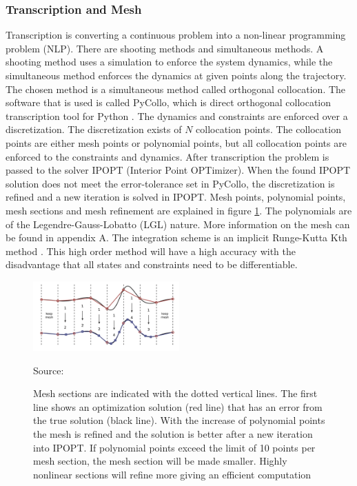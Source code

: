 \subsubsection{Transcription and Mesh}
\noindent Transcription is converting a continuous problem into a non-linear programming problem (NLP). There are shooting methods and simultaneous methods. A shooting method uses a simulation to enforce the system dynamics, while the simultaneous method enforces the dynamics at given points along the trajectory. The chosen method is a simultaneous method called orthogonal collocation. The software that is used is called PyCollo, which is direct orthogonal collocation transcription tool for Python \cite{brockie_predictive_nodate}. The dynamics and constraints are enforced over a discretization. The discretization exists of $N$ collocation points. The collocation points are either mesh points or polynomial points, but all collocation points are enforced to the constraints and dynamics. After transcription the problem is passed to the solver IPOPT (Interior Point OPTimizer). When the found IPOPT solution does not meet the error-tolerance set in PyCollo, the discretization is refined and a new iteration is solved in IPOPT. Mesh points, polynomial points, mesh sections and mesh refinement are explained in figure \ref{f_phmesh}. The polynomials are of the Legendre-Gauss-Lobatto (LGL) nature. More information on the mesh can be found in appendix A. The integration scheme is an implicit Runge-Kutta Kth method \cite{brockie_predictive_nodate}. This high order method will have a high accuracy with the disadvantage that all states and constraints need to be differentiable.

\begin{figure}
    \centering
    \includegraphics[width = 0.5\textwidth]{figure/phmesh.png}
    \caption[Mesh section and polynomials]{Mesh sections are indicated with the dotted vertical lines. The first line shows an optimization solution (red line) that has an error from the true solution (black line). With the increase of polynomial points the mesh is refined and the solution is better after a new iteration into IPOPT. If polynomial points exceed the limit of 10 points per mesh section, the mesh section will be made smaller. Highly nonlinear sections will refine more giving an efficient computation}
    \footnotesize Source: \cite{kelly_introduction_2017}
    \label{f_phmesh}
\end{figure}

